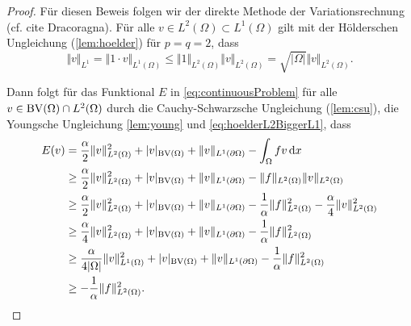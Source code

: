 \begin{proof}
  Für diesen Beweis folgen wir der direkte Methode der Variationsrechnung
  (cf. cite Dracoragna).
  Für alle $v\in L^2(\Omega)\subset L^1(\Omega)$ gilt mit der Hölderschen
  Ungleichung
  (\cref{lem:hoelder}) für $p=q=2$, dass
  \begin{equation}\label{eq:hoelderL2BiggerL1}
    \Vert v\Vert_{L^1} 
    = \Vert 1\cdot v\Vert_{L^1(\Omega)}
    \leq \Vert 1\Vert_{L^2(\Omega)}\Vert v\Vert_{L^2(\Omega)}
    =\sqrt{|\Omega|} \Vert v\Vert_{L^2(\Omega)}.
  \end{equation}

  Dann folgt für das Funktional $E$ in \eqref{eq:continuousProblem}
  für alle $v\in \textup{BV}(\Omega)\cap L^2(\Omega)$ durch die
  Cauchy-Schwarzsche Ungleichung (\cref{lem:csu}), die Youngsche
  Ungleichung \eqref{lem:young} und \cref{eq:hoelderL2BiggerL1}, dass
  \begin{equation}
    \label{eq:contProbBddFromBelow}
    \begin{aligned}
      E(v)&=\frac{\alpha}{2}\Vert v\Vert_{L^2(\Omega)}^2 + |v|_{\textup{BV}(\Omega)}
      +\Vert v\Vert_{L^1(\partial\Omega)}-\int_\Omega fv\,\mathrm{d}x\\
      &\geq 
      \frac{\alpha}{2}\Vert v\Vert_{L^2(\Omega)}^2 + |v|_{\textup{BV}(\Omega)}
      +\Vert v\Vert_{L^1(\partial\Omega)}
      -\Vert f\Vert_{L^2(\Omega)}\Vert v\Vert_{L^2(\Omega)}\\
      &\geq 
      \frac{\alpha}{2}\Vert v\Vert_{L^2(\Omega)}^2 + |v|_{\textup{BV}(\Omega)}
      +\Vert v\Vert_{L^1(\partial\Omega)}
      -\frac{1}{\alpha}\Vert f\Vert_{L^2(\Omega)}^2
      -\frac{\alpha}{4}\Vert v\Vert_{L^2(\Omega)}^2\\
      &\geq 
      \frac{\alpha}{4}\Vert v\Vert_{L^2(\Omega)}^2 + |v|_{\textup{BV}(\Omega)}
      +\Vert v\Vert_{L^1(\partial\Omega)}-\frac{1}{\alpha}\Vert
      f\Vert_{L^2(\Omega)}^2\\
      &\geq 
      \frac{\alpha}{4|\Omega|}\Vert v\Vert_{L^1(\Omega)}^2 + |v|_{\textup{BV}(\Omega)}
      +\Vert v\Vert_{L^1(\partial\Omega)}-\frac{1}{\alpha}\Vert
      f\Vert_{L^2(\Omega)}^2\\
      &\geq -\frac{1}{\alpha}\Vert f\Vert_{L^2(\Omega)}^2.
    \end{aligned}
  \end{equation}


\end{proof}

